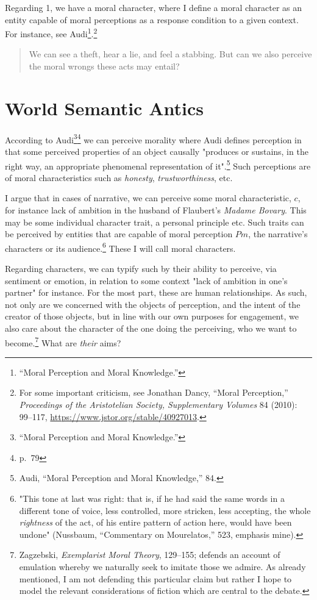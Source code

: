 \documentclass[phdthesis,12pt,final,a4paper]{wuthesis}
\theoremstyle{definition}
\theoremstyle{definition}
\theoremstyle{definition}
\theoremstyle{definition}
\theoremstyle{remark}
\begin{document}
Regarding 1, we have a moral character, where I define a moral character as an entity capable of moral perceptions as a response condition to a given context. For instance, see Audi\footnote{{``Moral {Perception} and {Moral Knowledge}.''}}.\footnote{For some important criticism, see Jonathan Dancy, {``Moral {Perception},''} \emph{Proceedings of the Aristotelian Society, Supplementary Volumes} 84 (2010): 99--117, \url{https://www.jstor.org/stable/40927013}.}

\begin{quote}
We can see a theft, hear a lie, and feel a stabbing. But can we also perceive the moral wrongs these acts may entail?
\end{quote}

\section{World Semantic Antics}\label{world-semantic-antics}

According to Audi\footnote{{``Moral {Perception} and {Moral Knowledge}.''}}\footnote{p.~79} we can perceive morality where Audi defines perception in that some perceived properties of an object causally "produces or sustains, in the right way, an appropriate phenomenal representation of it".\footnote{Audi, {``Moral {Perception} and {Moral Knowledge},''} 84.} Such perceptions are of moral characteristics such as \emph{honesty}, \emph{trustworthiness}, etc.

I argue that in cases of narrative, we can perceive some moral characteristic, \(c\), for instance lack of ambition in the husband of Flaubert's \emph{Madame Bovary}. This may be some individual character trait, a personal principle etc. Such traits can be perceived by entities that are capable of moral perception \(Pm\), the narrative's characters or its audience.\footnote{"\textquotesingle This tone at last was right\textquotesingle: that is, if he had said the same words in a different tone of voice, less controlled, more stricken, less accepting, the whole \emph{rightness} of the act, of his entire pattern of action here, would have been undone" (Nussbaum, {``Commentary on {Mourelatos},''} 523, emphasis mine).} These I will call moral characters.

Regarding characters, we can typify such by their ability to perceive, via sentiment or emotion, in relation to some context "lack of ambition in one's partner" for instance. For the most part, these are human relationships. As such, not only are we concerned with the objects of perception, and the intent of the creator of those objects, but in line with our own purposes for engagement, we also care about the character of the one doing the perceiving, who we want to become.\footnote{Zagzebski, \emph{Exemplarist {Moral Theory}}, 129--155; defends an account of emulation whereby we naturally seek to imitate those we admire. As already mentioned, I am not defending this particular claim but rather I hope to model the relevant considerations of fiction which are central to the debate.} What are \emph{their} aims?
\end{document}

